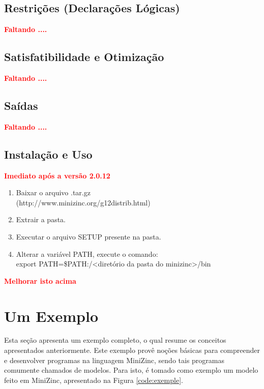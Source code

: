 \subsection{Restrições (Declarações Lógicas)}

{\bf \textcolor{red}{Faltando ....}}
\subsection{Satisfatibilidade e Otimização}

{\bf \textcolor{red}{Faltando ....}}
\subsection{Saídas}

{\bf \textcolor{red}{Faltando ....}}


\subsection{Instalação e Uso}

{\bf \textcolor{red}{Imediato após a versão 2.0.12}}


\begin{enumerate}   

\item Baixar o arquivo .tar.gz \\\hspace*{0.3cm}(http://www.minizinc.org/g12distrib.html)
\item Extrair a pasta.
\item Executar o arquivo SETUP presente na pasta.
\item Alterar a variável PATH, execute o comando:
\\export PATH=\$PATH:/\textless diretório da pasta do 
minizinc\textgreater/bin
\end{enumerate}



{\bf \textcolor{red}{Melhorar isto acima}}



\section{Um Exemplo}

Esta seção apresenta um exemplo completo, o qual  resume os conceitos apresentados anteriormente.
Este exemplo provê noções básicas para compreender e desenvolver programas na linguagem MiniZinc, sendo tais programas comumente chamados de modelos. Para isto, é tomado como exemplo um modelo feito em MiniZinc, apresentado na Figura \ref{code:exemple}.

